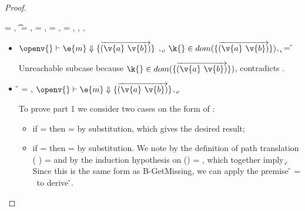 \begin{lemma}
\begin{enumerate}
\begin{proof}
\begin{case}[T-GetHMapAbsent]
  \e{} = { {}},
  \t{} = \Nil,
  \thenprop{\prop{}} = {\topprop{}},
  \elseprop{\prop{}} = {\topprop{}},
  \object{} = {\replacefor
               { {\x{}}}
                          {}
                          {\x{}}},
  \judgement {\propenv{}} { {\HMapgeneric {\mandatory{}} {\absent}}}
           { {}}
           {},
  \judgementtwo {\propenv{}} { {}},
  {\inabsent{\k{}}{\absent{}}}


  \begin{itemize}
    \item[]
      \begin{subcase}[B-Get]
        $\opsem {\openv{}}
        {\e{m}} {\curlymap{\overrightarrow{({\v{a}}\ {\v{b}})}}}$
        ,
         \opsem {\openv{}} {} {\k{}},
         $\keyinmap{\k{}}{\curlymap{\overrightarrow{({\v{a}}\ {\v{b}})}}}$,
          {\k{}} = {\v{}}

       Unreachable subcase because 
         $\keyinmap{\k{}}{\curlymap{\overrightarrow{({\v{a}}\ {\v{b}})}}}$,
         contradicts
                {\inabsent{\k{}}{\absent{}}}.
      \end{subcase}
    \item[]
      \begin{subcase}[B-GetMissing]
        \v{} = \nil,
        $\opsem {\openv{}}
        {\e{m}} {\curlymap{\overrightarrow{({\v{a}}\ {\v{b}})}}}$,
       \opsem {\openv{}} {} {\k{}},

         To prove part 1 we consider two cases on the form of : 
         \begin{itemize}
           \item
         if {} = \emptyobject{}
         then \object{} = \emptyobject{} by substitution, which gives the desired result;
           \item
         if  = { {}}
         then \object{} = { {}} by substitution.
         We note by the definition of path translation
         {\openv{}}({ {}}) =
         {}
         and by the induction hypothesis on 
         {{\openv{}}()} = {},
         which together imply 
         \inopenv {\openv{}} {\object{}} { {\k{}}}.
         Since this is the same form as B-GetMissing, we can apply the premise
        \v{} = \nil\ 
         to derive \inopenv {\openv{}} {\object{}} {\v{}}.
         \end{itemize}
         

\end{subcase}
\end{itemize}
\end{case}
\end{proof}
\end{enumerate}
\end{lemma}
